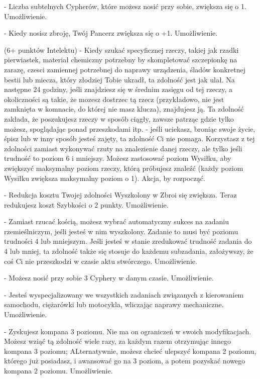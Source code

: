 { - Liczba subtelnych Cypherów, które możesz nosić przy sobie, zwiększa się o 1. Umożliwienie.

 - Kiedy nosisz zbroję, Twój Pancerz zwiększa się o +1.  Umożliwienie.

 (6+ punktów Intelektu) - Kiedy szukać specyficznej rzeczy, takiej jak rzadki pierwiastek, materiał chemiczny potrzebny by skompletować szczepionkę na zarazę, czesci zamiennej potrzebnej do naprawy urządzenia, śladów konkretnej bestii lub miecza, który złodziej Tobie ukradł, ta zdolność jest jak ulał. Na następne 24 godziny, jeśli znajdziesz się w średnim zasięgu  od tej rzeczy, a okoliczności są takie, że mozesz dostrzec tą rzecz (przykładowo, nie jest zamknięta w komnacie, do której nie masz klucza), znajdujesz ją. Ta zdolność zakłada, że poszukujesz rzeczy w sposób ciągły, zawsze patrząc gdzie tylko możesz, spoglądając ponad przeszkodami itp. - jeśli uciekasz, broniąc swoje życie, śpisz lub w inny sposób jesteś zajęty, ta zdolność Ci nie pomaga. Korzystasz z tej zdolności zamiast wykonywać rzuty na znalezienie danej rzeczy, ale tylko jeśli trudność to poziom 6 i mniejszy. Możesz zastosować poziom Wysiłku, aby zwiększyć maksymalny poziom rzeczy, którą próbujesz znaleźć (każdy poziom Wysiłku zwiększa maksymalny poziom o 1). Akcja, by rozpocząć. 

 - Redukcja kosztu Twojej zdolności Wyszkolony w Zbroi się zwiększa. Teraz redukujesz koszt Szybkości o 2 punkty. Umożliwienie.

 - Zamiast rzucać kością, możesz wybrać automatyczny sukces na zadaniu rzemieślniczym, jeśli jesteś w nim wyszkolony. Zadanie to musi być poziomu trudności 4 lub mniejszym. Jeśli jesteś w stanie zredukować trudność zadania do 4 lub mniej, ta zdolność także się stosuje do każdemu subzadania, założywszy, że coś Ci nie przeszkodzi w czasie aktu stwórczego. Umożliwienie.

 - Możesz nosić przy sobie 3 Cyphery w danym czasie. Umożliwienie.

 - Jesteś wyspecjalizowany we wszystkich zadaniach związanych z kierowaniem samochodu, ciężarówki lub motocykla, wliczając naprawy mechaniczne. Umożliwienie.

 - Zyskujesz kompana 3 poziomu. Nie ma on ograniczeń w swoich modyfikacjach. Możesz wziąć tą zdolność wiele razy, za każdym razem otrzymując innego kompana 3 poziomu; ALternatywnie, możesz chcieć ulepszyć kompana 2 poziomu, którego już posiadasz, i awansować go na 3 poziom, a potem pozyskać nowego kompana 2 poziomu. Umożliwienie.

}
